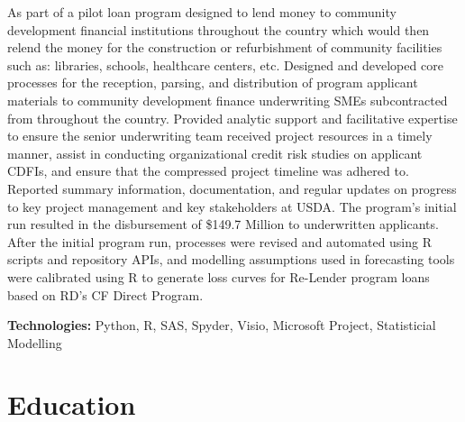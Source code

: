 \documentclass[10pt]{article} %
\begin{document}
{As part of a pilot loan program designed to lend money to community development financial institutions throughout the country which would then relend the money for the construction or refurbishment of community facilities such as: libraries, schools, healthcare centers, etc. Designed and developed core processes for the reception, parsing, and distribution of program applicant materials to community development finance underwriting SMEs subcontracted from throughout the country. Provided analytic support and facilitative expertise to ensure the senior underwriting team received project resources in a timely manner, assist in conducting organizational credit risk studies on applicant CDFIs, and ensure that the compressed project timeline was adhered to. Reported summary information, documentation, and regular updates on progress to key project management and key stakeholders at USDA. The program’s initial run resulted in the disbursement of \$149.7 Million to underwritten applicants. After the initial program run, processes were revised and automated using R scripts and repository APIs, and modelling assumptions used in forecasting tools were calibrated using R to generate loss curves for Re-Lender program loans based on RD’s CF Direct Program.\\
\rule{0mm}{5mm}\textbf{Technologies:} Python, R, SAS, Spyder, Visio, Microsoft Project, Statisticial Modelling}



\pagebreak


\section{Education}
\end{document}
